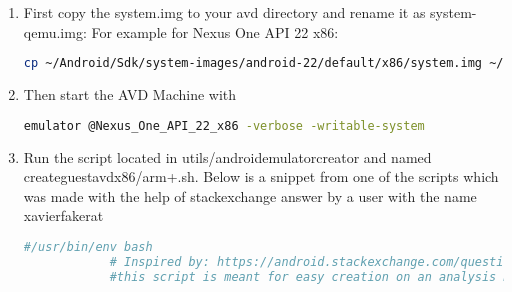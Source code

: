 \documentclass[../main.tex]{subfile}
\begin{document}
		\begin{enumerate}
			\item First copy the system.img to your avd directory and rename it as system-qemu.img: For example for Nexus One API 22 x86: \newline 
			\begin{lstlisting}[language=bash]
			cp ~/Android/Sdk/system-images/android-22/default/x86/system.img ~/.android/avd/Nexus_One_API_22_x86.avd/system-qemu.img
			\end{lstlisting}
						
			
			\item Then start the AVD Machine with \newline 
			\begin{lstlisting}[language=bash]
			emulator @Nexus_One_API_22_x86 -verbose -writable-system
			\end{lstlisting}
						
			
			\item Run the script located in utils/android\textunderscore emulator\textunderscore creator and named create\textunderscore guest\textunderscore avd\textunderscore x86/arm+.sh. Below is a snippet from one of the scripts which was made with the help of stackexchange answer by a user with the name xavier\textunderscore fakerat \cite{android_emulator_7.1_root_stackexchange} \newline
			\begin{lstlisting}[language=bash]
			#/usr/bin/env bash
			# Inspired by: https://android.stackexchange.com/questions/171442/root-android-virtual-device-with-android-7-1-1/176447
			#this script is meant for easy creation on an analysis machine for android emulator avd
			

\end{lstlisting}
\end{enumerate}
\end{document}
